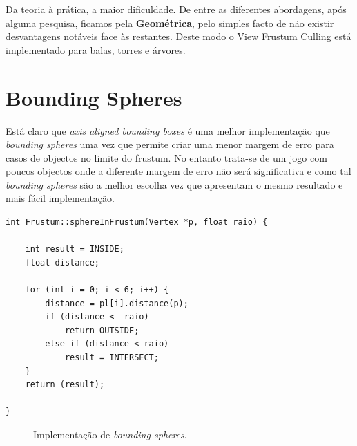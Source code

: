 Da teoria à prática, a maior dificuldade. De entre as diferentes abordagens, após alguma pesquisa, ficamos pela {\bf Geométrica}, pelo simples facto de não existir desvantagens notáveis face às restantes. Deste modo o View Frustum Culling está implementado para balas, torres e árvores.

\section{Bounding Spheres}
Está claro que \textit{axis aligned bounding boxes} é uma melhor implementação que \textit{bounding spheres} uma vez que permite criar uma menor margem de erro para casos de objectos no limite do frustum. No entanto trata-se de um jogo com poucos objectos onde a diferente margem de erro não será significativa e como tal \textit{bounding spheres} são a melhor escolha vez que apresentam o mesmo resultado e mais fácil implementação.


\begin{lstlisting}[caption=Método para teste com \textit{bounding spheres}.]
int Frustum::sphereInFrustum(Vertex *p, float raio) {

    int result = INSIDE;
    float distance;

    for (int i = 0; i < 6; i++) {
        distance = pl[i].distance(p);
        if (distance < -raio)
            return OUTSIDE;
        else if (distance < raio)
            result = INTERSECT;
    }
    return (result);

}
\end{lstlisting}

\begin{figure}[here]
                 \caption{Implementação de \textit{bounding spheres}.}
                 \label{fig:prototype}
\end{figure}
